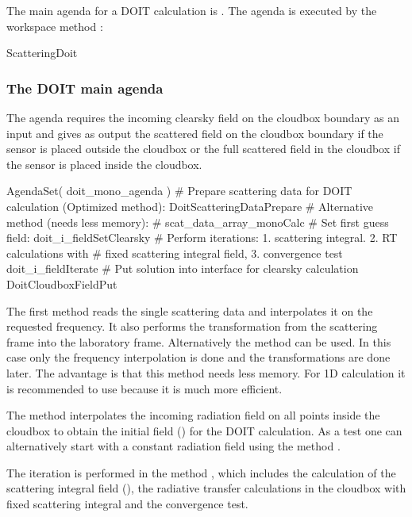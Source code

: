 The main agenda for a DOIT calculation is
. 
The agenda is executed by the workspace method
:
\begin{code}
ScatteringDoit
\end{code}

\subsubsection{The DOIT main agenda}
\label{sec:scattering:doit_main_agenda}

The agenda  requires the incoming
clearsky field on the cloudbox boundary as an input and gives as
output the scattered field on the cloudbox boundary if the sensor is
placed outside the cloudbox or the full scattered field in the
cloudbox if the sensor is placed inside the cloudbox.
\begin{code}
AgendaSet( doit_mono_agenda ){
 # Prepare scattering data for DOIT calculation (Optimized method):
   DoitScatteringDataPrepare
 # Alternative method (needs less memory):
 # scat_data_array_monoCalc
 # Set first guess field:		
   doit_i_fieldSetClearsky
 # Perform iterations: 1. scattering integral. 2. RT calculations with 
 #   fixed scattering integral field, 3. convergence test 
   doit_i_fieldIterate
 # Put solution into interface for clearsky calculation   
   DoitCloudboxFieldPut
 }		
\end{code}
The first method  reads the
single scattering data and interpolates it on the requested
frequency. It also performs the transformation from the scattering
frame into the laboratory frame. Alternatively the method
 can be used. In this case only the
frequency interpolation is done and the transformations are done
later. The advantage is that this method needs less memory. For 1D
calculation it is recommended to use
 because it is much more
efficient. 

The method  interpolates the
incoming radiation field on all points inside the cloudbox to obtain
the initial field () for the DOIT calculation. 
As a test one can alternatively start with a constant radiation field
using the method . 

The iteration is performed in the method
, which includes the calculation of
the scattering integral field (), the
radiative transfer calculations in 
the cloudbox with fixed scattering integral and the convergence test.

